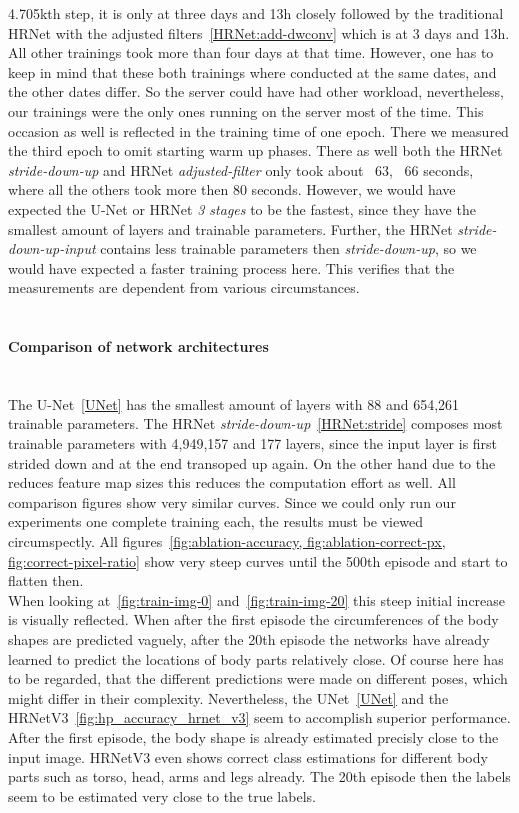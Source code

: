 4.705kth step, it is only at three days and 13h closely followed by the traditional HRNet with the adjusted filters~\ref{HRNet:add-dwconv}
which is at 3 days and 13h. All other trainings took more than four days at that time.
However, one has to keep in mind that these both trainings where conducted at the same dates, and the other dates differ.
So the server could have had other workload, nevertheless, our trainings were the only ones running on the server most
of the time. This occasion as well is reflected in the training time of one epoch.
There we measured the third epoch to omit starting warm up phases.
There as well both the HRNet \textit{stride-down-up} and HRNet \textit{adjusted-filter} only took about ~63, ~66 seconds,
where all the others took more then 80 seconds.
However, we would have expected the U-Net or HRNet \textit{3 stages} to be the fastest, since they have the smallest
amount of layers and trainable parameters.
Further, the HRNet \textit{stride-down-up-input} contains less trainable parameters then \textit{stride-down-up}, so
we would have expected a faster training process here.
This verifies that the measurements are dependent from various circumstances.
\\\mbox{}\\
\paragraph{Comparison of network architectures}\mbox{}\\
%
The U-Net~\ref{UNet} has the smallest amount of layers with 88 and 654,261 trainable parameters.
The HRNet \textit{stride-down-up}~\ref{HRNet:stride} composes most trainable parameters with 4,949,157 and 177 layers, since the input
layer is first strided down and at the end transoped up again.
On the other hand due to the reduces feature map sizes this reduces the computation effort as well.
All comparison figures show very similar curves.
Since we could only run our experiments one complete training each, the results must be viewed circumspectly.
All figures~\ref{fig:ablation-accuracy, fig:ablation-correct-px, fig:correct-pixel-ratio} show very steep curves until
the 500th episode and start to flatten then.\\
When looking at~\ref{fig:train-img-0} and~\ref{fig:train-img-20} this steep initial increase is visually reflected.
When after the first episode the circumferences of the body shapes are predicted vaguely, after the 20th episode the
networks have already learned to predict the locations of body parts relatively close.
Of course here has to be regarded, that the different predictions were made on different poses, which might differ in
their complexity.
Nevertheless, the UNet~\ref{UNet} and the HRNetV3~\ref{fig:hp_accuracy_hrnet_v3} seem to accomplish superior performance.
After the first episode, the body shape is already estimated precisly close to the input image.
HRNetV3 even shows correct class estimations for different body parts such as torso, head, arms and legs already.
The 20th episode then the labels seem to be estimated very close to the true labels.

